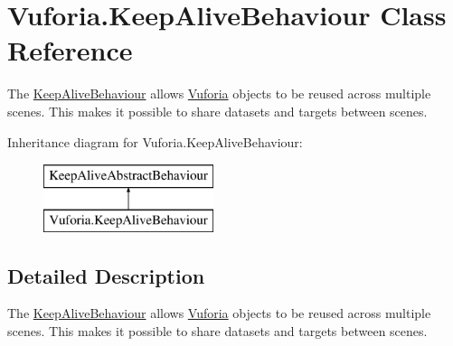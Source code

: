 \hypertarget{class_vuforia_1_1_keep_alive_behaviour}{}\section{Vuforia.\+Keep\+Alive\+Behaviour Class Reference}
\label{class_vuforia_1_1_keep_alive_behaviour}


The \hyperlink{class_vuforia_1_1_keep_alive_behaviour}{Keep\+Alive\+Behaviour} allows \hyperlink{namespace_vuforia}{Vuforia} objects to be reused across multiple scenes. This makes it possible to share datasets and targets between scenes.  


Inheritance diagram for Vuforia.\+Keep\+Alive\+Behaviour\+:\begin{figure}[H]
\begin{center}
\leavevmode
\includegraphics[height=2.000000cm]{class_vuforia_1_1_keep_alive_behaviour}
\end{center}
\end{figure}


\subsection{Detailed Description}
The \hyperlink{class_vuforia_1_1_keep_alive_behaviour}{Keep\+Alive\+Behaviour} allows \hyperlink{namespace_vuforia}{Vuforia} objects to be reused across multiple scenes. This makes it possible to share datasets and targets between scenes. 

